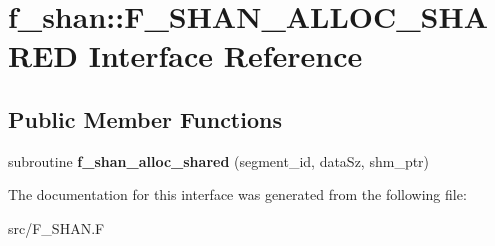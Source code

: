 \hypertarget{interfacef__shan_1_1F__SHAN__ALLOC__SHARED}{}\section{f\+\_\+shan\+:\+:F\+\_\+\+S\+H\+A\+N\+\_\+\+A\+L\+L\+O\+C\+\_\+\+S\+H\+A\+R\+ED Interface Reference}
\label{interfacef__shan_1_1F__SHAN__ALLOC__SHARED}
\subsection*{Public Member Functions}
\begin{DoxyCompactItemize}
\item 
subroutine {\bfseries f\+\_\+shan\+\_\+alloc\+\_\+shared} (segment\+\_\+id, data\+Sz, shm\+\_\+ptr)\hypertarget{interfacef__shan_1_1F__SHAN__ALLOC__SHARED_abc1e8a19b7f16e0fcbc19a49147479bb}{}\label{interfacef__shan_1_1F__SHAN__ALLOC__SHARED_abc1e8a19b7f16e0fcbc19a49147479bb}

\end{DoxyCompactItemize}


The documentation for this interface was generated from the following file\+:\begin{DoxyCompactItemize}
\item 
src/F\+\_\+\+S\+H\+A\+N.\+F\end{DoxyCompactItemize}
